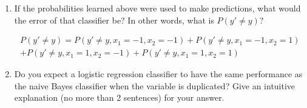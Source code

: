 \begin{enumerate}
\begin{enumerate}
  \item \relax[3 points] If the probabilities learned above were used to
    make predictions, what would the error of that classifier be? In
    other words, what is $P(y' \ne y)$?


\begin{equation*}
\begin{aligned}
P(y' \ne y) = P(y' \ne y, x_1 = -1, x_2=-1) + P(y' \ne y, x_1 = -1, x_2=1) \\+ P(y' \ne y, x_1 = 1, x_2=-1) + P(y' \ne y, x_1 = 1, x_2=1) 
\end{aligned}
\end{equation*} 


  \item \relax[2 points] Do you expect a logistic regression
    classifier to have the same performance as the naive Bayes
    classifier when the variable is duplicated? Give an intuitive
    explanation (no more than 2 sentences) for your answer.

  \end{enumerate}

\end{enumerate}




